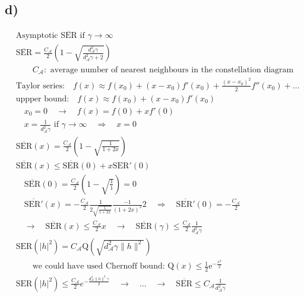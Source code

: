 \subsection*{d)}
\begin{align*}
	& \text{Asymptotic $\overline{\mathrm{SER}}$ if $\gamma\rightarrow\infty$} \\
	& \overline{\mathrm{SER}}=\frac{C_\mathcal{A}}{2}\left(1-\sqrt{\frac{d_\mathcal{A}^2\gamma}{d_\mathcal{A}^2\gamma+2}}\right) \\
	& \qquad C_\mathcal{A}:\text{ average number of nearest neighbours in the constellation diagram} \\
	& \text{Taylor series:}\quad f\left(x\right)\approx f\left(x_0\right)+\left(x-x_0\right)f'\left(x_0\right)+\frac{\left(x-x_0\right)^2}{2}f''\left(x_0\right)+\ldots \\
	& \text{uppper bound:}\quad f\left(x\right)\approx f\left(x_0\right)+\left(x-x_0\right)f'\left(x_0\right) \\
	& \quad x_0=0\quad\rightarrow\quad f\left(x\right)=f\left(0\right)+xf'\left(0\right) \\
	& \quad x=\frac{1}{d_\mathcal{A}^2\gamma}\text{ if }\gamma\rightarrow\infty\quad\Rightarrow\quad x=0 \\
	& \overline{\mathrm{SER}}\left(x\right)=\frac{C_\mathcal{A}}{2}\left(1-\sqrt{\frac{1}{1+2x}}\right) \\
	& \overline{\mathrm{SER}}\left(x\right)\le\overline{\mathrm{SER}}\left(0\right)+x\mathrm{SER}'\left(0\right) \\
	& \quad\overline{\mathrm{SER}}\left(0\right)=\frac{C_\mathcal{A}}{2}\left(1-\sqrt{\frac{1}{1}}\right)=0 \\
	& \quad\overline{\mathrm{SER}'}\left(x\right)=-\frac{C_\mathcal{A}}{2}\frac{1}{2\sqrt{\frac{1}{1+2x}}}\frac{-1}{\left(1+2x\right)^2}2\quad\Rightarrow\quad\overline{\mathrm{SER}'}\left(0\right)=-\frac{C_\mathcal{A}}{2} \\
	& \quad\rightarrow\quad\overline{\mathrm{SER}}\left(x\right)\le\frac{C_\mathcal{A}}{2}x\quad\rightarrow\quad\boxed{\overline{\mathrm{SER}}\left(\gamma\right)\le\frac{C_\mathcal{A}}{2}\frac{1}{d_\mathcal{A}^2\gamma}} \\
	& \mathrm{SER}\left(\left|h\right|^2\right)=C_\mathcal{A}\mathrm{Q}\left(\sqrt{d_\mathcal{A}^2\gamma\|h\|^2}\right) \\
	& \qquad\text{we could have used Chernoff bound: }\mathrm{Q}\left(x\right)\le\frac{1}{2}\mathrm{e}^{-\frac{x^2}{2}} \\
	& \mathrm{SER}\left(\left|h\right|^2\right)\le\frac{C_\mathcal{A}}{2}e^{-\frac{d_\mathcal{A}^2\|h\|^2\gamma}{2}}\quad\rightarrow\quad\ldots\quad\rightarrow\quad\boxed{\overline{\mathrm{SER}}\le C_\mathcal{A}\frac{1}{d_\mathcal{A}^2\gamma}} \\
\end{align*}